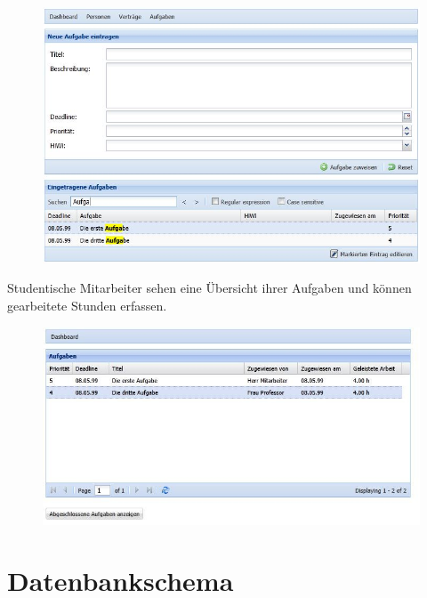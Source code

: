 \documentclass[article,colorback,accentcolor=tud2c]{tudreport}
\begin{document}
\begin{figure}[h]
    \begin{center}
        \includegraphics[scale=0.7]{img/mitarbeiter-aufgaben}
    \end{center}
\end{figure}

Studentische Mitarbeiter sehen eine Übersicht ihrer Aufgaben und können gearbeitete Stunden erfassen.

\begin{figure}[h]
    \begin{center}
        \includegraphics[scale=0.7]{img/hiwi-dashboard}
    \end{center}
\end{figure}


\newpage

\section{Datenbankschema} %
\label{sec:datenbankschema}
\end{document}
